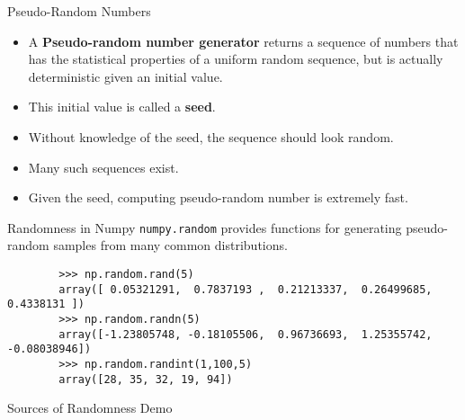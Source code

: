 \documentclass[serif,xcolor=pdftex,dvipsnames,table,hyperref={bookmarks=false,breaklinks}]{beamer}
\begin{document}
\begin{frame}[t]{Pseudo-Random Numbers}
	\begin{itemize}[<+->]
		\item A \textbf{Pseudo-random number generator} returns a sequence of numbers that has the statistical properties of a uniform random sequence, but is actually deterministic given an initial value.
		\item This initial value is called a \textbf{seed}.
		\item Without knowledge of the seed, the sequence should look random.
		\item Many such sequences exist.
		\item Given the seed, computing pseudo-random number is extremely fast.
	\end{itemize}
\end{frame}

\begin{frame}[t,fragile]{Randomness in Numpy}
	\verb|numpy.random| provides functions for generating pseudo-random samples from many common distributions.
	
	\pause
	\begin{lstlisting}
		>>> np.random.rand(5)
		array([ 0.05321291,  0.7837193 ,  0.21213337,  0.26499685,  0.4338131 ])
		>>> np.random.randn(5)
		array([-1.23805748, -0.18105506,  0.96736693,  1.25355742, -0.08038946])
		>>> np.random.randint(1,100,5)
		array([28, 35, 32, 19, 94])
	\end{lstlisting}
\end{frame}

\begin{frame}[t]{Sources of Randomness}
	\centering
	\Huge{Demo}
\end{frame}
\end{document}
